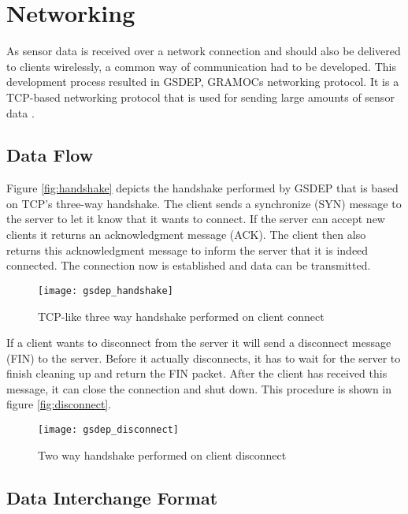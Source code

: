 \chapter{Networking}
\label{ch:networking}

\author{Nico Kratky}
%
As sensor data is received over a network connection and should also be delivered to clients wirelessly, a common way of communication had to be developed. This development process resulted in GSDEP, GRAMOCs networking protocol. It is a TCP-based networking protocol that is used for sending large amounts of sensor data \autocite{rfc793}.

\section{Data Flow}
\label{sec:networking_data-flow}

Figure \vref{fig:handshake} depicts the handshake performed by GSDEP that is based on TCP's three-way handshake. The client sends a synchronize (SYN) message to the server to let it know that it wants to connect. If the server can accept new clients it returns an acknowledgment message (ACK). The client then also returns this acknowledgment message to inform the server that it is indeed connected. The connection now is established and data can be transmitted.

\begin{figure}[h]
    \centering
    \texttt{[image: gsdep\_handshake]}
    \caption{TCP-like three way handshake performed on client connect}
    \label{fig:handshake}
\end{figure}

If a client wants to disconnect from the server it will send a disconnect message (FIN) to the server. Before it actually disconnects, it has to wait for the server to finish cleaning up and return the FIN packet. After the client has received this message, it can close the connection and shut down. This procedure is shown in figure \vref{fig:disconnect}.

\begin{figure}[h]
    \centering
    \texttt{[image: gsdep\_disconnect]}
    \caption{Two way handshake performed on client disconnect}
    \label{fig:disconnect}
\end{figure}

\section{Data Interchange Format}

